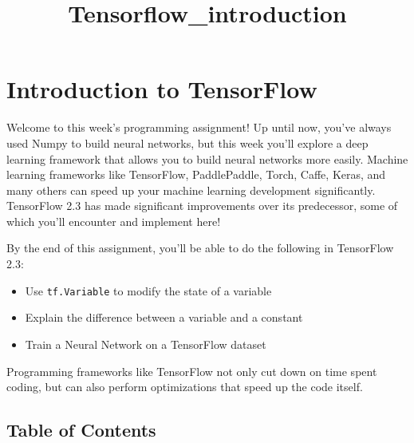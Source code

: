 \documentclass[11pt]{article}
\title{Tensorflow\_introduction}
\providecommand{\tightlist}{%
      \setlength{\itemsep}{0pt}\setlength{\parskip}{0pt}}
\begin{document}
    
    \maketitle
    
    

    
    \hypertarget{introduction-to-tensorflow}{%
\section{Introduction to TensorFlow}\label{introduction-to-tensorflow}}

Welcome to this week's programming assignment! Up until now, you've
always used Numpy to build neural networks, but this week you'll explore
a deep learning framework that allows you to build neural networks more
easily. Machine learning frameworks like TensorFlow, PaddlePaddle,
Torch, Caffe, Keras, and many others can speed up your machine learning
development significantly. TensorFlow 2.3 has made significant
improvements over its predecessor, some of which you'll encounter and
implement here!

By the end of this assignment, you'll be able to do the following in
TensorFlow 2.3:

\begin{itemize}
\tightlist
\item
  Use \texttt{tf.Variable} to modify the state of a variable
\item
  Explain the difference between a variable and a constant
\item
  Train a Neural Network on a TensorFlow dataset
\end{itemize}

Programming frameworks like TensorFlow not only cut down on time spent
coding, but can also perform optimizations that speed up the code
itself.

    \hypertarget{table-of-contents}{%
\subsection{Table of Contents}\label{table-of-contents}}
\end{document}
